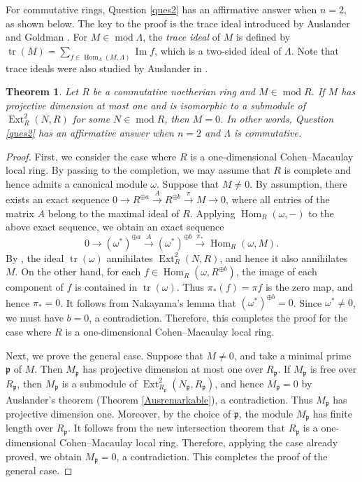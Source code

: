 \documentclass{amsart}
\newtheorem{thm}{Theorem}[section]
\theoremstyle{definition}
\theoremstyle{remark}
\numberwithin{equation}{thm}
\def\Ext{\operatorname{Ext}}
\def\Hom{\operatorname{Hom}}
\def\mod{\operatorname{mod}}
\def\p{\mathfrak{p}}
\def\trace{\operatorname{tr}}
\begin{document}
For commutative rings, Question \ref{ques2} has an affirmative answer when $n=2$, as shown below.
The key to the proof is the trace ideal introduced by Auslander and Goldman \cite{AG}.
For $M\in\mod\Lambda$, the {\em trace ideal} of $M$ is defined by $\trace(M)=\sum_{f\in\Hom_\Lambda(M,\Lambda)}\operatorname{Im}f$, which is a two-sided ideal of $\Lambda$.
Note that trace ideals were also studied by Auslander in \cite{Aus69}.

\begin{thm}\label{thmpd1}
Let $R$ be a commutative noetherian ring and $M\in\mod R$.
If $M$ has projective dimension at most one and is isomorphic to a submodule of $\Ext^2_R(N,R)$ for some $N\in\mod R$, then $M=0$.
In other words, Question \ref{ques2} has an affirmative answer when $n=2$ and $\Lambda$ is commutative.
\end{thm}

\begin{proof}
First, we consider the case where $R$ is a one-dimensional Cohen--Macaulay local ring.
By passing to the completion, we may assume that $R$ is complete and hence admits a canonical module $\omega$.
Suppose that $M\ne0$. By assumption, there exists an exact sequence $0\to R^{\oplus a}\xrightarrow{A}R^{\oplus b}\xrightarrow{\pi}M\to0$, where all entries of the matrix $A$ belong to the maximal ideal of $R$.
Applying $\Hom_R(\omega,-)$ to the above exact sequence, we obtain an exact sequence
$$0\to(\omega^\ast)^{\oplus a}\xrightarrow{A}(\omega^\ast)^{\oplus b}\xrightarrow{\pi_\ast}\Hom_R(\omega,M).$$
By \cite[Theorem 2.3]{DKT}, the ideal $\trace(\omega)$ annihilates $\Ext^2_R(N,R)$, and hence it also annihilates $M$.
On the other hand, for each $f\in\Hom_R(\omega,R^{\oplus b})$, the image of each component of $f$ is contained in $\trace(\omega)$.
Thus $\pi_\ast(f)=\pi f$ is the zero map, and hence $\pi_\ast=0$.
It follows from Nakayama's lemma that $(\omega^\ast)^{\oplus b}=0$.
Since $\omega^\ast\ne0$, we must have $b=0$, a contradiction.
Therefore, this completes the proof for the case where $R$ is a one-dimensional Cohen--Macaulay local ring.

Next, we prove the general case.
Suppose that $M\ne0$, and take a minimal prime $\p$ of $M$.
Then $M_\p$ has projective dimension at most one over $R_\p$.
If $M_\p$ is free over $R_\p$, then $M_\p$ is a submodule of $\Ext^2_{R_\p}(N_\p,R_\p)$, and hence $M_\p=0$ by Auslander's theorem (Theorem \ref{Ausremarkable}), a contradiction.
Thus $M_\p$ has projective dimension one. Moreover, by the choice of $\p$, the module $M_\p$ has finite length over $R_\p$.
It follows from the new intersection theorem \cite{PS,Rob87} that $R_\p$ is a one-dimensional Cohen--Macaulay local ring.
Therefore, applying the case already proved, we obtain $M_\p=0$, a contradiction.
This completes the proof of the general case.
\end{proof}
\end{document}
